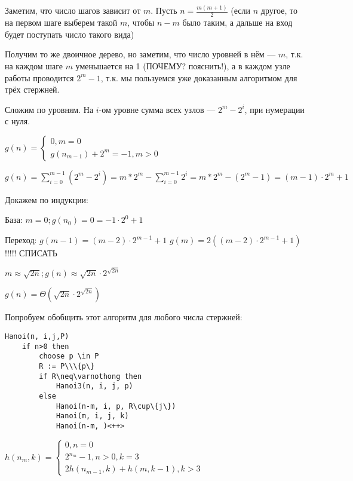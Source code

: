 \documentclass[11pt,a4paper]{article}
\begin{document}
Заметим, что число шагов зависит от $m$. Пусть $n=\frac{m(m+1)}{2}$ (если $n$ другое, то на первом шаге выберем такой $m$, чтобы $n-m$ было таким, а дальше на вход будет поступать число такого вида)

Получим то же двоичное дерево, но заметим, что число уровней в нём --- $m$, т.к. на каждом шаге $m$ уменьшается на 1 (ПОЧЕМУ? пояснить!), а в каждом узле работы проводится $2^m-1$, т.к. мы пользуемся уже доказанным алгоритмом для трёх стержней.

Сложим по уровням. На $i$-ом уровне сумма всех узлов --- $2^m-2^i$, при нумерации с нуля.

$g(n) = \begin{cases}
    0, m=0\\
    g(n_{m-1})+2^m=-1, m>0
\end{cases}$

$g(n) = \sum\limits_{i=0}^{m-1}(2^m-2^i) = m*2^m-\sum\limits_{i=0}^{m-1}2^i =
m*2^m-(2^m-1) = (m-1)\cdot2^m+1 $

Докажем по индукции:

База: $m=0; g(n_0) = 0 = -1\cdot2^0+1$

Переход: $g(m-1)=(m-2)\cdot2^{m-1}+1$
$g(m)=2((m-2)\cdot2^{m-1}+1)$ !!!!! СПИСАТЬ

$m\approx\sqrt{2n}; g(n)\approx\sqrt{2n}\cdot2^{\sqrt{2n}}$

$g(n) = \Theta(\sqrt{2n}\cdot2^{\sqrt{2n}})$


Попробуем обобщить этот алгоритм для любого числа стержней:

\begin{lstlisting}
Hanoi(n, i,j,P)
    if n>0 then
        choose p \in P 
        R := P\\\{p\}
        if R\neq\varnothong then
            Hanoi3(n, i, j, p)
        else
            Hanoi(n-m, i, p, R\cup\{j\})
            Hanoi(m, i, j, k)
            Hanoi(n-m, )<++>
\end{lstlisting}

$h(n_m, k) = \begin{cases}
    0, n=0\\
    2^{n_m}-1, n>0, k=3\\
    2h(n_{m-1}, k) + h(m, k-1), k>3
\end{cases}$
\end{document}
